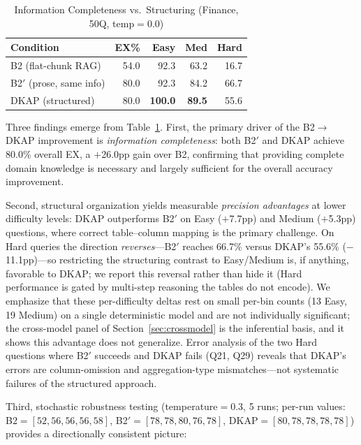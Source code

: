 \documentclass[fleqn,10pt,lineno]{wlpeerj}
\begin{document}
\begin{table}[H]
\centering
\caption{Information Completeness vs.\ Structuring (Finance, 50Q, temp$=$0.0)}
\label{tab:b2prime}
\footnotesize
\begin{tabularx}{\columnwidth}{@{}Xrrrr@{}}
\toprule
\textbf{Condition} & \textbf{EX\%} & \textbf{Easy} & \textbf{Med} & \textbf{Hard} \\
\midrule
B2 (flat-chunk RAG) & 54.0 & 92.3 & 63.2 & 16.7 \\
B2$'$ (prose, same info) & 80.0 & 92.3 & 84.2 & 66.7 \\
DKAP (structured)   & 80.0 & \textbf{100.0} & \textbf{89.5} & 55.6 \\
\bottomrule
\end{tabularx}
\end{table}

Three findings emerge from Table~\ref{tab:b2prime}. First, the primary driver of the B2$\to$DKAP improvement is \textit{information completeness}: both B2$'$ and DKAP achieve 80.0\% overall EX, a $+$26.0pp gain over B2, confirming that providing complete domain knowledge is necessary and largely sufficient for the overall accuracy improvement.

Second, structural organization yields measurable \textit{precision advantages} at lower difficulty levels: DKAP outperforms B2$'$ on Easy ($+$7.7pp) and Medium ($+$5.3pp) questions, where correct table--column mapping is the primary challenge. On Hard queries the direction \textit{reverses}---B2$'$ reaches 66.7\% versus DKAP's 55.6\% ($-$11.1pp)---so restricting the structuring contrast to Easy/Medium is, if anything, favorable to DKAP; we report this reversal rather than hide it (Hard performance is gated by multi-step reasoning the tables do not encode). We emphasize that these per-difficulty deltas rest on small per-bin counts (13 Easy, 19 Medium) on a single deterministic model and are not individually significant; the cross-model panel of Section~\ref{sec:crossmodel} is the inferential basis, and it shows this advantage does not generalize. Error analysis of the two Hard questions where B2$'$ succeeds and DKAP fails (Q21, Q29) reveals that DKAP's errors are column-omission and aggregation-type mismatches---not systematic failures of the structured approach.

Third, stochastic robustness testing (temperature$=$0.3, 5 runs; per-run values: B2$=[52,56,56,56,58]$, B2$'=[78,78,80,76,78]$, DKAP$=[80,78,78,78,78]$) provides a directionally consistent picture:
\end{document}

